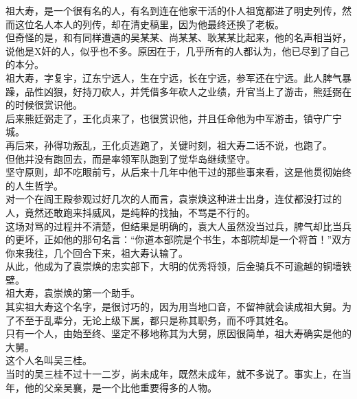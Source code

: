 \begin{multicols}{\theparacolNo}
祖大寿，是一个很有名的人，有名到连在他家干活的仆人祖宽都进了明史列传，然而这位名人本人的列传，却在清史稿里，因为他最终还换了老板。\\

但奇怪的是，和有同样遭遇的吴某某、尚某某、耿某某比起来，他的名声相当好，说他是X奸的人，似乎也不多。原因在于，几乎所有的人都认为，他已尽到了自己的本分。\\

祖大寿，字复宇，辽东宁远人，生在宁远，长在宁远，参军还在宁远。此人脾气暴躁，品性凶狠，好持刀砍人，并凭借多年砍人之业绩，升官当上了游击，熊廷弼在的时候很赏识他。\\

后来熊廷弼走了，王化贞来了，也很赏识他，并且任命他为中军游击，镇守广宁城。\\

再后来，孙得功叛乱，王化贞逃跑了，关键时刻，祖大寿二话不说，也跑了。\\

但他并没有跑回去，而是率领军队跑到了觉华岛继续坚守。\\

坚守原则，却不吃眼前亏，从后来十几年中他干过的那些事来看，这是他贯彻始终的人生哲学。\\

对一个在阎王殿参观过好几次的人而言，袁崇焕这种进士出身，连仗都没打过的人，竟然还敢跑来抖威风，是纯粹的找抽，不骂是不行的。\\

这场对骂的过程并不清楚，但结果是明确的，袁大人虽然没当过兵，脾气却比当兵的更坏，正如他的那句名言：“你道本部院是个书生，本部院却是一个将首！”双方你来我往，几个回合下来，祖大寿认输了。\\

从此，他成为了袁崇焕的忠实部下，大明的优秀将领，后金骑兵不可逾越的铜墙铁壁。\\

祖大寿，袁崇焕的第一个助手。\\

其实祖大寿这个名字，是很讨巧的，因为用当地口音，不留神就会读成祖大舅。为了不至于乱辈分，无论上级下属，都只是称其职务，而不呼其姓名。\\

只有一个人，由始至终、坚定不移地称其为大舅，原因很简单，祖大寿确实是他的大舅。\\

这个人名叫吴三桂。\\

当时的吴三桂不过十一二岁，尚未成年，既然未成年，就不多说了。事实上，在当年，他的父亲吴襄，是一个比他重要得多的人物。\\


\end{multicols}
